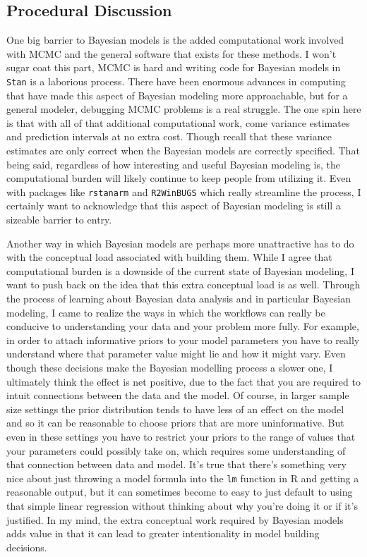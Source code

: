 \documentclass[12pt,twoside]{reedthesis}
\begin{document}
\hypertarget{procedural-discussion}{%
\subsection{Procedural Discussion}\label{procedural-discussion}}

One big barrier to Bayesian models is the added computational work involved with MCMC and the general software that exists for these methods. I won't sugar coat this part, MCMC is hard and writing code for Bayesian models in \texttt{Stan} is a laborious process. There have been enormous advances in computing that have made this aspect of Bayesian modeling more approachable, but for a general modeler, debugging MCMC problems is a real struggle. The one spin here is that with all of that additional computational work, come variance estimates and prediction intervals at no extra cost. Though recall that these variance estimates are only correct when the Bayesian models are correctly specified. That being said, regardless of how interesting and useful Bayesian modeling is, the computational burden will likely continue to keep people from utilizing it. Even with packages like \texttt{rstanarm} and \texttt{R2WinBUGS} which really streamline the process, I certainly want to acknowledge that this aspect of Bayesian modeling is still a sizeable barrier to entry.

Another way in which Bayesian models are perhaps more unattractive has to do with the conceptual load associated with building them. While I agree that computational burden is a downside of the current state of Bayesian modeling, I want to push back on the idea that this extra conceptual load is as well. Through the process of learning about Bayesian data analysis and in particular Bayesian modeling, I came to realize the ways in which the workflows can really be conducive to understanding your data and your problem more fully. For example, in order to attach informative priors to your model parameters you have to really understand where that parameter value might lie and how it might vary. Even though these decisions make the Bayesian modelling process a slower one, I ultimately think the effect is net positive, due to the fact that you are required to intuit connections between the data and the model. Of course, in larger sample size settings the prior distribution tends to have less of an effect on the model and so it can be reasonable to choose priors that are more uninformative. But even in these settings you have to restrict your priors to the range of values that your parameters could possibly take on, which requires some understanding of that connection between data and model. It's true that there's something very nice about just throwing a model formula into the \texttt{lm} function in R and getting a reasonable output, but it can sometimes become to easy to just default to using that simple linear regression without thinking about why you're doing it or if it's justified. In my mind, the extra conceptual work required by Bayesian models adds value in that it can lead to greater intentionality in model building decisions.
\end{document}
